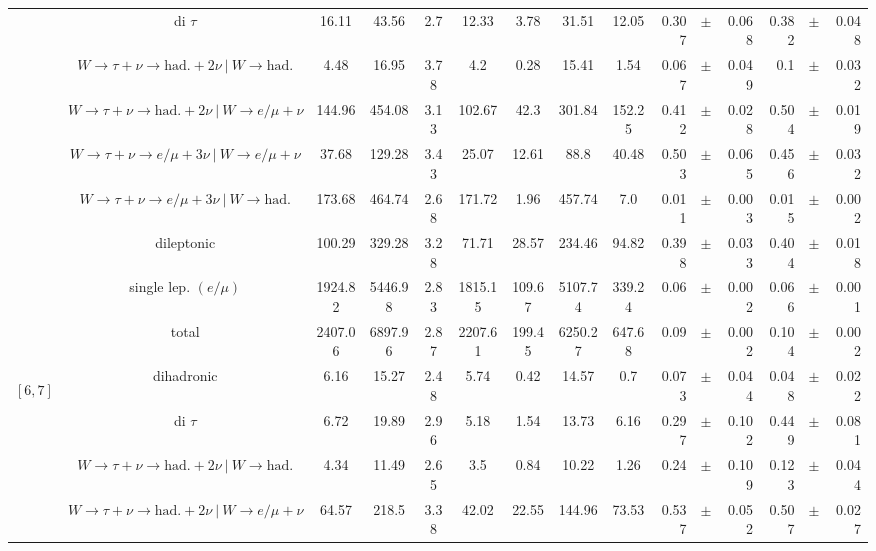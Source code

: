 \documentclass[12pt]{paper}
\begin{document}
\begin{table}[ht]
\begin{center}
{\begin{tabular}{|c|c|c|c|c|c|c|c|c|rrr|rrr|}
\cline{2-15}
 &di $\tau$ & 16.11 & 43.56 & 2.7 & 12.33 & 3.78 & 31.51 & 12.05 & 0.307 & $\pm$ & 0.068 & 0.382 & $\pm$ & 0.048\\
\cline{2-15}
 &$W\rightarrow \tau + \nu \rightarrow \textrm{had.}+2\nu ~|~ W \rightarrow \textrm{had.}$ & 4.48 & 16.95 & 3.78 & 4.2 & 0.28 & 15.41 & 1.54 & 0.067 & $\pm$ & 0.049 & 0.1 & $\pm$ & 0.032\\
\cline{2-15}
 &$W\rightarrow \tau + \nu \rightarrow \textrm{had.}+2\nu ~|~ W \rightarrow e/\mu + \nu$ & 144.96 & 454.08 & 3.13 & 102.67 & 42.3 & 301.84 & 152.25 & 0.412 & $\pm$ & 0.028 & 0.504 & $\pm$ & 0.019\\
\cline{2-15}
 &$W\rightarrow \tau + \nu \rightarrow e/\mu+3\nu ~|~ W \rightarrow e/\mu + \nu$ & 37.68 & 129.28 & 3.43 & 25.07 & 12.61 & 88.8 & 40.48 & 0.503 & $\pm$ & 0.065 & 0.456 & $\pm$ & 0.032\\
\cline{2-15}
 &$W\rightarrow \tau + \nu \rightarrow e/\mu+3\nu ~|~ W \rightarrow \textrm{had.}$ & 173.68 & 464.74 & 2.68 & 171.72 & 1.96 & 457.74 & 7.0 & 0.011 & $\pm$ & 0.003 & 0.015 & $\pm$ & 0.002\\
\cline{2-15}
 &dileptonic & 100.29 & 329.28 & 3.28 & 71.71 & 28.57 & 234.46 & 94.82 & 0.398 & $\pm$ & 0.033 & 0.404 & $\pm$ & 0.018\\
\cline{2-15}
 &single lep. $(e/\mu)$ & 1924.82 & 5446.98 & 2.83 & 1815.15 & 109.67 & 5107.74 & 339.24 & 0.06 & $\pm$ & 0.002 & 0.066 & $\pm$ & 0.001\\
\cline{2-15}
 &total & 2407.06 & 6897.96 & 2.87 & 2207.61 & 199.45 & 6250.27 & 647.68 & 0.09 & $\pm$ & 0.002 & 0.104 & $\pm$ & 0.002\\
\hline
\hline\multirow{9}{*}{\begin{sideways}$[6,7]$\end{sideways}}
 &dihadronic & 6.16 & 15.27 & 2.48 & 5.74 & 0.42 & 14.57 & 0.7 & 0.073 & $\pm$ & 0.044 & 0.048 & $\pm$ & 0.022\\
\cline{2-15}
 &di $\tau$ & 6.72 & 19.89 & 2.96 & 5.18 & 1.54 & 13.73 & 6.16 & 0.297 & $\pm$ & 0.102 & 0.449 & $\pm$ & 0.081\\
\cline{2-15}
 &$W\rightarrow \tau + \nu \rightarrow \textrm{had.}+2\nu ~|~ W \rightarrow \textrm{had.}$ & 4.34 & 11.49 & 2.65 & 3.5 & 0.84 & 10.22 & 1.26 & 0.24 & $\pm$ & 0.109 & 0.123 & $\pm$ & 0.044\\
\cline{2-15}
 &$W\rightarrow \tau + \nu \rightarrow \textrm{had.}+2\nu ~|~ W \rightarrow e/\mu + \nu$ & 64.57 & 218.5 & 3.38 & 42.02 & 22.55 & 144.96 & 73.53 & 0.537 & $\pm$ & 0.052 & 0.507 & $\pm$ & 0.027\\

\end{tabular}}
\end{center}
\end{table}
\end{document}
